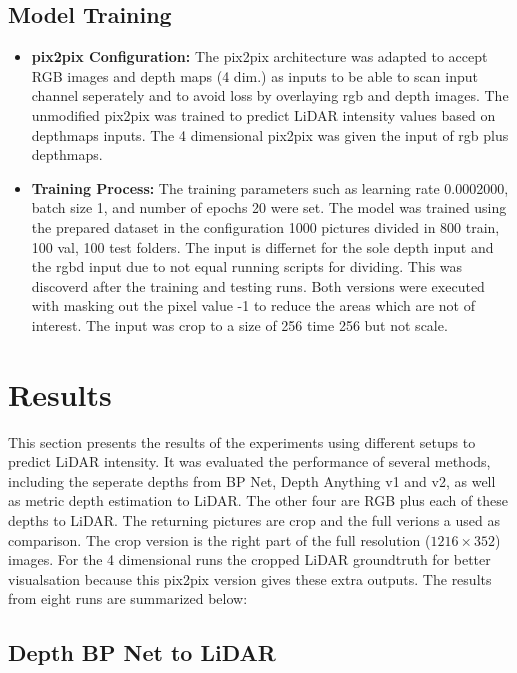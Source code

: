 \newpage
\subsection{Model Training}\label{modeltraining}
\begin{itemize}
	\item \textbf{pix2pix Configuration:} The pix2pix architecture was adapted to accept RGB images and depth maps (4 dim.) as inputs to be able to scan input channel seperately and to avoid loss by overlaying rgb and depth images. The unmodified pix2pix was trained to predict LiDAR intensity values based on depthmaps inputs. The 4 dimensional pix2pix was given the input of rgb plus depthmaps.
	\item \textbf{Training Process:} The training parameters such as learning rate 0.0002000, batch size 1, and number of epochs 20 were set. The model was trained using the prepared dataset in the configuration 1000 pictures divided in 800 train, 100 val, 100 test folders. The input is differnet for the sole depth input and the rgbd input due to not equal running scripts for dividing. This was discoverd after the training and testing runs. Both versions were executed with masking out the pixel value -1 to reduce the areas which are not of interest. The input was crop to a size of 256 time 256  but not scale.
\end{itemize}

\section{Results} \label{results}

This section presents the results of the  experiments using different setups to predict LiDAR intensity. It was  evaluated the performance of several methods, including the seperate depths from BP Net, Depth Anything v1 and v2, as well as metric depth estimation to LiDAR. The other four are RGB plus each of these depths to LiDAR. The returning pictures are crop and the full verions a used as comparison. The crop version is the right part of the full resolution ($1216 \times 352$) images. For the 4 dimensional runs the cropped LiDAR groundtruth for better visualsation because this pix2pix version gives these extra outputs. The results from eight runs are summarized below:
\subsection{Depth BP Net to LiDAR}

